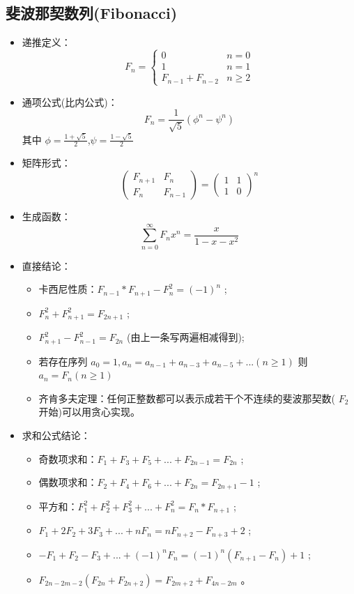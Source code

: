 \subsection{斐波那契数列(Fibonacci)}
\begin{itemize}
    \item 递推定义：
        $$F_n = \begin{cases}
            0 & n = 0 \\
            1 & n = 1 \\
            F_{n-1} + F_{n-2} & n \geq 2
        \end{cases}$$
    
    \item 通项公式(比内公式)：
        $$F_n = \frac{1}{\sqrt{5}} \left( \phi^n - \psi^n \right)$$
        其中 $\phi = \frac{1+\sqrt{5}}{2}$,$\psi = \frac{1-\sqrt{5}}{2}$
    
    \item 矩阵形式：
        $$\begin{pmatrix} F_{n+1} & F_n \\ F_n & F_{n-1} \end{pmatrix} = \begin{pmatrix} 1 & 1 \\ 1 & 0 \end{pmatrix}^n$$
    
    \item 生成函数：
        $$\sum_{n=0}^{\infty} F_n x^n = \frac{x}{1-x-x^2}$$
    
    \item 直接结论：
        \begin{itemize}
            \item 卡西尼性质：$F_{n-1} * F_{n+1}-F_n^2=(-1)^n$ ;
            \item $F_{n}^2+F_{n+1}^2=F_{2n+1}$ ;
            \item $F_{n+1}^2-F_{n-1}^2=F_{2n}$ (由上一条写两遍相减得到);
            \item 若存在序列 $a_0=1,a_n=a_{n-1}+a_{n-3}+a_{n-5}+...(n\ge 1)$ 则 $a_n=F_n(n\ge 1)$ 
            \item 齐肯多夫定理：任何正整数都可以表示成若干个不连续的斐波那契数( $F_2$ 开始)可以用贪心实现。
        \end{itemize}

    \item 求和公式结论：
        \begin{itemize}
            \item 奇数项求和：$F_1+F_3+F_5+...+F_{2n-1}=F_{2n}$ ;
            \item 偶数项求和：$F_2+F_4+F_6+...+F_{2n}=F_{2n+1}-1$ ;
            \item 平方和：$F_1^2+F_2^2+F_3^2+...+F_n^2=F_n*F_{n+1}$ ;
            \item $F_1+2F_2+3F_3+...+nF_n=nF_{n+2}-F_{n+3}+2$ ;
            \item $-F_1+F_2-F_3+...+(-1)^nF_n=(-1)^n(F_{n+1}-F_n)+1$ ;
            \item $F_{2n-2m-2}(F_{2n}+F_{2n+2})=F_{2m+2}+F_{4n-2m}$ 。
        \end{itemize}


\end{itemize}
